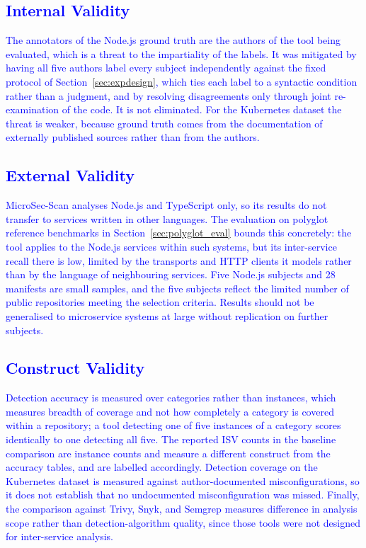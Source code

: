 \documentclass[preprint,12pt]{elsarticle}
\newcommand{\new}[1]{\textcolor{blue}{#1}}
\begin{document}
\new{\subsection{Internal Validity}}

\new{The annotators of the Node.js ground truth are the authors of the tool
being evaluated, which is a threat to the impartiality of the labels. It was
mitigated by having all five authors label every subject independently
against the fixed protocol of Section~\ref{sec:expdesign}, which ties each
label to a syntactic condition rather than a judgment, and by resolving
disagreements only through joint re-examination of the code. It is not
eliminated. For the Kubernetes dataset the threat is weaker, because ground
truth comes from the documentation of externally published sources rather
than from the authors.}

\new{\subsection{External Validity}}

\new{MicroSec-Scan analyses Node.js and TypeScript only, so its results do
not transfer to services written in other languages. The evaluation on
polyglot reference benchmarks in
Section~\ref{sec:polyglot_eval} bounds this concretely: the tool applies to
the Node.js services within such systems, but its inter-service recall there
is low, limited by the transports and HTTP clients it models rather than by
the language of neighbouring services. Five Node.js subjects and 28
manifests are small samples, and the five subjects reflect the limited
number of public repositories meeting the selection criteria. Results should
not be generalised to microservice systems at large without replication on
further subjects.}

\new{\subsection{Construct Validity}}

\new{Detection accuracy is measured over categories rather than instances,
which measures breadth of coverage and not how completely a category is
covered within a repository; a tool detecting one of five instances of a
category scores identically to one detecting all five. The reported ISV
counts in the baseline comparison are instance counts and measure a
different construct from the accuracy tables, and are labelled accordingly.
Detection coverage on the Kubernetes dataset is measured against
author-documented misconfigurations, so it does not establish that no
undocumented misconfiguration was missed. Finally, the comparison against
Trivy, Snyk, and Semgrep measures difference in analysis scope rather than
detection-algorithm quality, since those tools were not designed for
inter-service analysis.}
\end{document}
